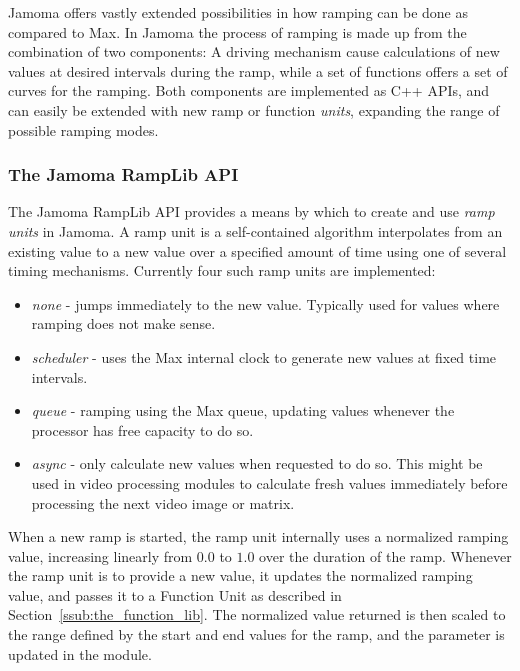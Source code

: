 \documentclass{NIME-alternate}
\begin{document}
Jamoma offers vastly extended possibilities in how ramping can be done as compared to Max. In Jamoma the process of ramping is made up from the combination of two components: A driving mechanism cause calculations of new values at desired intervals during the ramp, while a set of functions offers a set of curves for the ramping. Both components are implemented as C++ APIs, and can easily be extended with new ramp or function \emph{units}, expanding the range of possible ramping modes.



\subsubsection{The Jamoma RampLib API} %
\label{ssub:the_ramp_lib}

The Jamoma RampLib API provides a means by which to create and use \emph{ramp units} in Jamoma.  A ramp unit is a self-contained algorithm interpolates from an existing value to a new value over a specified amount of time using one of several timing mechanisms. Currently four such ramp units are implemented:

\begin{itemize}

	\item \emph{none} - jumps immediately to the new value. Typically used for values where ramping does not make sense.

	\item \emph{scheduler} - uses the Max internal clock to generate new values at fixed time intervals.

	\item \emph{queue} - ramping using the Max queue, updating values whenever the processor has free capacity to do so.

	\item \emph{async} - only calculate new values when requested to do so. This might be used in video processing modules to calculate fresh values immediately before processing the next video image or matrix.
	
\end{itemize}

When a new ramp is started, the ramp unit internally uses a normalized ramping value, increasing linearly from $0.0$ to $1.0$ over the duration of the ramp. Whenever the ramp unit is to provide a new value, it updates the normalized ramping value, and passes it to a Function Unit as described in Section~\ref{ssub:the_function_lib}. The normalized value returned is then scaled to the range defined by the start and end values for the ramp, and the parameter is updated in the module.
\end{document}
